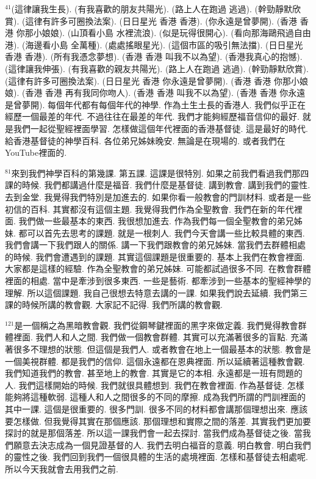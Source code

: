 \documentclass{book}
\begin{document}
$^{41}$(這律讓我生長).
(有我喜歡的朋友共陽光).
(路上人在跑過 逃過).
(幹勁靜默欣賞).
(這律有許多可圈換法案).
(日日星光 香港 香港).
(你永遠是曾夢開).
(香港 香港 你那小娘娘).
(山頂看小島 水裡流浪).
(似是玩得很開心).
(看向那海鷗飛過自由港).
(海邊看小島 全萬種).
(處處搖眼星光).
(這個市區的吸引無法擋).
(日日星光 香港 香港).
(所有我憑念夢想).
(香港 香港 叫我不以為望).
(香港我真心的抱憾).
(這律讓我伸張).
(有我喜歡的親友共陽光).
(路上人在跑過 逃過).
(幹勁靜默欣賞).
(這律有許多可圈換法案).
(日日星光 香港 你永遠是曾夢開).
(香港 香港 你那小娘娘).
(香港 香港 再有我同你吻人).
(香港 香港 叫我不以為望).
(香港 香港 你永遠是曾夢開).
每個年代都有每個年代的神學.
作為土生土長的香港人.
我們似乎正在經歷一個最差的年代.
不過往往在最差的年代.
我們才能夠經歷福音信仰的最好.
就是我們一起從聖經裡面學習.
怎樣做這個年代裡面的香港基督徒.
這是最好的時代.
給香港基督徒的神學百科.
各位弟兄姊妹晚安.
無論是在現場的.
或者我們在YouTube裡面的.

$^{81}$來到我們神學百科的第幾課.
第五課.
這課是很特別.
如果之前我們看過我們那四課的時候.
我們都講過什麼是福音.
我們什麼是基督徒.
講到教會.
講到我們的靈性.
去到金堂.
我覺得我們特別是加進去的.
如果你看一般教會的門訓材料.
或者是一些初信的百科.
其實都沒有這個主題.
我覺得我們作為全聖教會.
我們在新的年代裡面.
我們做一些最基本的東西.
我很想加進去.
作為我們每一個全聖教會的弟兄姊妹.
都可以首先去思考的課題.
就是一根刺人.
我們今天會講一些比較具體的東西.
我們會講一下我們跟人的關係.
講一下我們跟教會的弟兄姊妹.
當我們去群體相處的時候.
我們會遭遇到的課題.
其實這個課題是很重要的.
基本上我們在教會裡面.
大家都是這樣的經驗.
作為全聖教會的弟兄姊妹.
可能都試過很多不同.
在教會群體裡面的相處.
當中是牽涉到很多東西.
一些是藝術.
都牽涉到一些基本的聖經神學的理解.
所以這個課題.
我自己很想去特意去講的一課.
如果我們說去延續.
我們第三課的時候所講的教會觀.
大家記不記得.
我們所講的教會觀.

$^{121}$是一個稱之為黑暗教會觀.
我們從鋼琴鍵裡面的黑字來做定義.
我們覺得教會群體裡面.
我們人和人之間.
我們做一個教會群體.
其實可以充滿著很多的盲點.
充滿著很多不理想的狀態.
但這個是我們人.
或者教會在地上一個最基本的狀態.
教會是一個美視群體.
都是我們的信仰.
這個永遠都在恩典裡面.
所以延續著這種教會觀.
我們知道我們的教會.
甚至地上的教會.
其實是它的本相.
永遠都是一班有問題的人.
我們這樣開始的時候.
我們就很具體想到.
我們在教會裡面.
作為基督徒.
怎樣能夠將這種軟弱.
這種人和人之間很多的不同的摩擦.
成為我們所謂的門訓裡面的其中一課.
這個是很重要的.
很多門訓.
很多不同的材料都會講那個理想出來.
應該要怎樣做.
但我覺得其實在那個應該.
那個理想和實際之間的落差.
其實我們更加要探討的就是那個落差.
所以這一課我們會一起去探討.
當我們成為基督徒之後.
當我們願意去決志成為一個見證基督的人.
我們去明白福音的意義.
明白教會.
明白我們的靈性之後.
我們回到我們一個很具體的生活的處境裡面.
怎樣和基督徒去相處呢.
所以今天我就會去用我們之前.
\end{document}
